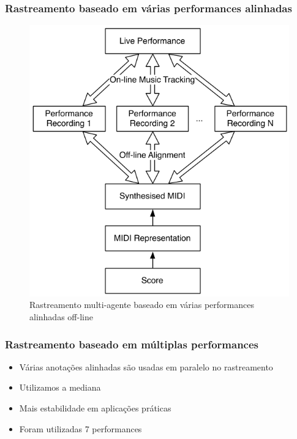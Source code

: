 \begin{frame}[label=figura2]
  \frametitle{Rastreamento baseado em várias performances alinhadas}
  \begin{figure}[!ht]
    \centering
    \includegraphics[height=0.7\textheight]{src/img/2-Figure2-1.png}
    \caption*{Rastreamento multi-agente baseado em várias performances alinhadas off-line}
  \end{figure}
\end{frame}

\begin{frame}
  \frametitle{Rastreamento baseado em múltiplas performances}
  \begin{itemize}
    \item Várias anotações alinhadas são usadas em paralelo no rastreamento\pause
    \item Utilizamos a mediana \pause %
    \item Mais estabilidade em aplicações práticas \pause
    \item Foram utilizadas 7 performances
  \end{itemize}
\end{frame}
